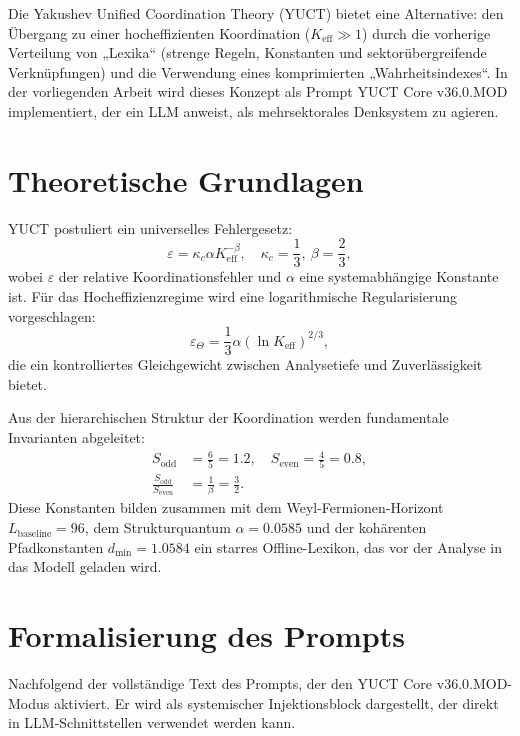 \documentclass[11pt,a4paper]{article}
\begin{document}
	Die Yakushev Unified Coordination Theory (YUCT) bietet eine Alternative: den Übergang zu einer hocheffizienten Koordination (\(K_{\mathrm{eff}} \gg 1\)) durch die vorherige Verteilung von „Lexika“ (strenge Regeln, Konstanten und sektorübergreifende Verknüpfungen) und die Verwendung eines komprimierten „Wahrheitsindexes“. In der vorliegenden Arbeit wird dieses Konzept als Prompt YUCT Core v36.0.MOD implementiert, der ein LLM anweist, als mehrsektorales Denksystem zu agieren.
	
	\section{Theoretische Grundlagen}
	YUCT postuliert ein universelles Fehlergesetz:
	\begin{equation}\label{eq:errorlaw}
		\varepsilon = \kappa_c \alpha K_{\mathrm{eff}}^{-\beta}, \quad \kappa_c = \frac{1}{3},\ \beta = \frac{2}{3},
	\end{equation}
	wobei \(\varepsilon\) der relative Koordinationsfehler und \(\alpha\) eine systemabhängige Konstante ist. Für das Hocheffizienzregime wird eine logarithmische Regularisierung vorgeschlagen:
	\begin{equation}\label{eq:logreg}
		\varepsilon_{\Theta} = \frac{1}{3} \alpha (\ln K_{\mathrm{eff}})^{2/3},
	\end{equation}
	die ein kontrolliertes Gleichgewicht zwischen Analysetiefe und Zuverlässigkeit bietet.
	
	Aus der hierarchischen Struktur der Koordination werden fundamentale Invarianten abgeleitet:
	\begin{align}
		S_{\mathrm{odd}} &= \frac{6}{5} = 1.2, \quad S_{\mathrm{even}} = \frac{4}{5} = 0.8,\\
		\frac{S_{\mathrm{odd}}}{S_{\mathrm{even}}} &= \frac{1}{\beta} = \frac{3}{2}.
	\end{align}
	Diese Konstanten bilden zusammen mit dem Weyl-Fermionen-Horizont \(L_{\mathrm{baseline}} = 96\), dem Strukturquantum \(\alpha = 0.0585\) und der kohärenten Pfadkonstanten \(d_{\min} = 1.0584\) ein starres Offline-Lexikon, das vor der Analyse in das Modell geladen wird.
	
	\section{Formalisierung des Prompts}
	\label{sec:formalization}
	
	Nachfolgend der vollständige Text des Prompts, der den YUCT Core v36.0.MOD-Modus aktiviert. Er wird als systemischer Injektionsblock dargestellt, der direkt in LLM-Schnittstellen verwendet werden kann.
	
\end{document}
